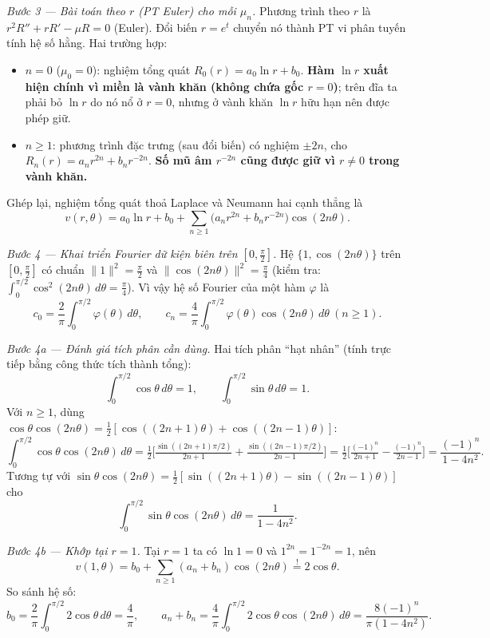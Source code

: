 \emph{Bước 3 --- Bài toán theo $r$ (PT Euler) cho mỗi $\mu_n$.}
Phương trình theo $r$ là $r^2R''+rR'-\mu R=0$ (Euler). Đổi biến $r=e^t$ chuyển nó thành PT vi phân tuyến tính hệ số hằng. Hai trường hợp:
\begin{itemize}
  \item $n=0$ ($\mu_0=0$): nghiệm tổng quát $R_0(r)=a_0\ln r+b_0$. \textbf{Hàm $\ln r$ xuất hiện chính vì miền là vành khăn (không chứa gốc $r=0$)}; trên đĩa ta phải bỏ $\ln r$ do nó nổ ở $r=0$, nhưng ở vành khăn $\ln r$ hữu hạn nên được phép giữ.
  \item $n\ge1$: phương trình đặc trưng (sau đổi biến) có nghiệm $\pm 2n$, cho $R_n(r)=a_n r^{2n}+b_n r^{-2n}$. \textbf{Số mũ âm $r^{-2n}$ cũng được giữ vì $r\ne0$ trong vành khăn.}
\end{itemize}
Ghép lại, nghiệm tổng quát thoả Laplace và Neumann hai cạnh thẳng là
\[
  \boxed{\,v(r,\theta)=a_0\ln r+b_0+\sum_{n\ge1}\big(a_n r^{2n}+b_n r^{-2n}\big)\cos(2n\theta).\,}
\]

\emph{Bước 4 --- Khai triển Fourier dữ kiện biên trên $[0,\tfrac{\pi}{2}]$.} Hệ $\{1,\cos(2n\theta)\}$ trên $[0,\tfrac{\pi}{2}]$ có chuẩn $\|1\|^2=\tfrac{\pi}{2}$ và $\|\cos(2n\theta)\|^2=\tfrac{\pi}{4}$ (kiểm tra: $\int_0^{\pi/2}\cos^2(2n\theta)\,d\theta=\tfrac{\pi}{4}$). Vì vậy hệ số Fourier của một hàm $\varphi$ là
\[
  c_0=\frac{2}{\pi}\!\int_0^{\pi/2}\!\varphi(\theta)\,d\theta,\qquad c_n=\frac{4}{\pi}\!\int_0^{\pi/2}\!\varphi(\theta)\cos(2n\theta)\,d\theta\ (n\ge1).
\]

\emph{Bước 4a --- Đánh giá tích phân cần dùng.} Hai tích phân ``hạt nhân'' (tính trực tiếp bằng công thức tích thành tổng):
\[
  \int_0^{\pi/2}\!\cos\theta\,d\theta=1,\qquad \int_0^{\pi/2}\!\sin\theta\,d\theta=1.
\]
Với $n\ge1$, dùng $\cos\theta\cos(2n\theta)=\tfrac12[\cos((2n+1)\theta)+\cos((2n-1)\theta)]$:
\[
  \int_0^{\pi/2}\!\cos\theta\cos(2n\theta)\,d\theta=\tfrac12\Big[\tfrac{\sin((2n+1)\pi/2)}{2n+1}+\tfrac{\sin((2n-1)\pi/2)}{2n-1}\Big]
  =\tfrac12\Big[\tfrac{(-1)^n}{2n+1}-\tfrac{(-1)^n}{2n-1}\Big]=\frac{(-1)^n}{1-4n^2}.
\]
Tương tự với $\sin\theta\cos(2n\theta)=\tfrac12[\sin((2n+1)\theta)-\sin((2n-1)\theta)]$ cho
\[
  \int_0^{\pi/2}\!\sin\theta\cos(2n\theta)\,d\theta=\frac{1}{1-4n^2}.
\]

\emph{Bước 4b --- Khớp tại $r=1$.} Tại $r=1$ ta có $\ln 1=0$ và $1^{2n}=1^{-2n}=1$, nên
\[
  v(1,\theta)=b_0+\sum_{n\ge1}(a_n+b_n)\cos(2n\theta)\overset{!}{=}2\cos\theta.
\]
So sánh hệ số:
\[
  b_0=\frac{2}{\pi}\!\int_0^{\pi/2}\!2\cos\theta\,d\theta=\frac{4}{\pi},\qquad
  a_n+b_n=\frac{4}{\pi}\!\int_0^{\pi/2}\!2\cos\theta\cos(2n\theta)\,d\theta=\frac{8(-1)^n}{\pi(1-4n^2)}.
\]

